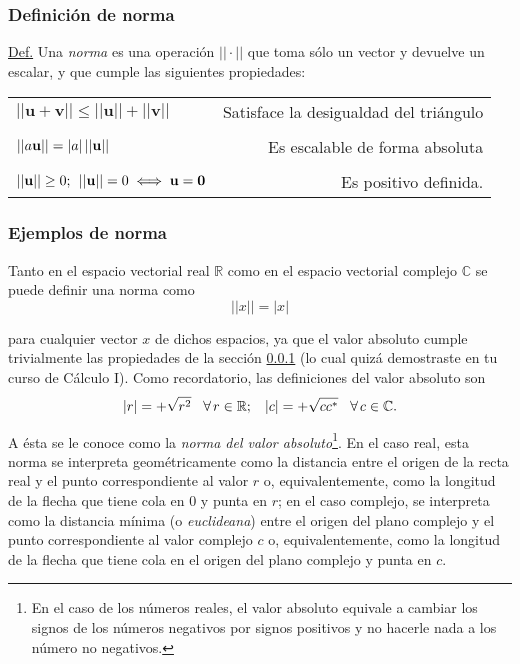 \documentclass[12pt]{article}
\begin{document}
\subsubsection{Definición de norma} \label{Def:Norma}

\begin{tcolorbox}
\underline{Def.} Una \textit{norma} es una operación $||\cdot||$ que toma sólo un vector y devuelve un escalar, y que cumple las siguientes propiedades:

\begin{center}
    \begin{tabular}{lr}
        $||\mathbf{u}+\mathbf{v}|| \leq ||\mathbf{u}|| + ||\mathbf{v}||$ & Satisface la desigualdad del triángulo \\ \\
        $||a\mathbf{u}|| = |a|\hspace{0.5mm}||\mathbf{u}||$ & Es escalable de forma absoluta \\ \\
        $||\mathbf{u}||\geq0; \hspace{1.5mm}||\mathbf{u}||=0\iff \mathbf{u}=\mathbf{0}$ & Es positivo definida.
    \end{tabular}
\end{center}

\end{tcolorbox}{}

\subsubsection{Ejemplos de norma}

Tanto en el espacio vectorial real $\mathbb{R}$ como en el espacio vectorial complejo $\mathbb{C}$ se puede definir una norma como $$||x|| = |x|$$

\noindent para cualquier vector $x$ de dichos espacios, ya que el valor absoluto cumple trivialmente las propiedades de la sección \ref{Def:Norma} (lo cual quizá demostraste en tu curso de Cálculo I). Como recordatorio, las definiciones del valor absoluto son $$|r| = +\sqrt{r^2} \hspace{3mm}\forall\hspace{0.5mm}r\in\mathbb{
R}; \hspace{3mm} |c| = +\sqrt{cc^*}\hspace{3mm}\forall\hspace{0.5mm}c\in\mathbb{C}.$$

\noindent A ésta se le conoce como la \emph{norma del valor absoluto}\footnote{En el caso de los números reales, el valor absoluto equivale a cambiar los signos de los números negativos por signos positivos y no hacerle nada a los número no negativos.}. En el caso real, esta norma se interpreta geométricamente como la distancia entre el origen de la recta real y el punto correspondiente al valor $r$ o, equivalentemente, como la longitud de la flecha que tiene cola en $0$ y punta en $r$; en el caso complejo, se interpreta como la distancia mínima (o \emph{euclideana}) entre el origen del plano complejo y el punto correspondiente al valor complejo $c$ o, equivalentemente, como la longitud de la flecha que tiene cola en el origen del plano complejo y punta en $c$. 
\end{document}
